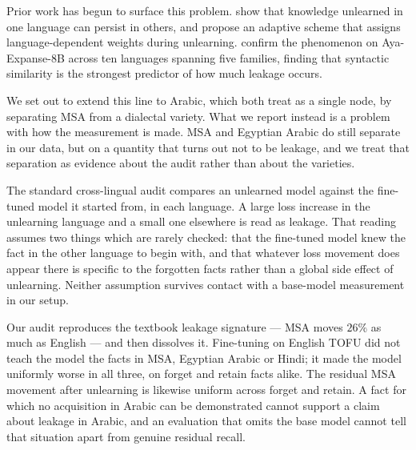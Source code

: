 \documentclass[11pt]{article}
\begin{document}
Prior work has begun to surface this problem.
\citet{choi2024crosslingual} show that knowledge unlearned in one language
can persist in others, and propose an adaptive scheme that assigns
language-dependent weights during unlearning.
\citet{farashah2026multilingual} confirm the phenomenon on Aya-Expanse-8B
\citep{dang2024ayaexpanse} across ten languages spanning five families,
finding that syntactic similarity is the strongest predictor of how much
leakage occurs.

We set out to extend this line to Arabic, which both treat as a single node,
by separating MSA from a dialectal variety. What we report instead is a
problem with how the measurement is made. MSA and Egyptian Arabic do still
separate in our data, but on a quantity that turns out not to be leakage,
and we treat that separation as evidence about the audit rather than about
the varieties.

The standard cross-lingual audit compares an unlearned model against the
fine-tuned model it started from, in each language. A large loss increase in
the unlearning language and a small one elsewhere is read as leakage. That
reading assumes two things which are rarely checked: that the fine-tuned
model knew the fact in the other language to begin with, and that whatever
loss movement does appear there is specific to the forgotten facts rather
than a global side effect of unlearning. Neither assumption survives contact
with a base-model measurement in our setup.

Our audit reproduces the textbook leakage signature — MSA moves $26\%$ as
much as English — and then dissolves it. Fine-tuning on English TOFU did not
teach the model the facts in MSA, Egyptian Arabic or Hindi; it made the model
uniformly worse in all three, on forget and retain facts alike. The residual
MSA movement after unlearning is likewise uniform across forget and retain.
A fact for which no acquisition in Arabic can be demonstrated cannot support a
claim about leakage in Arabic, and an evaluation that omits the base model
cannot tell that situation apart from genuine residual recall.
\end{document}
